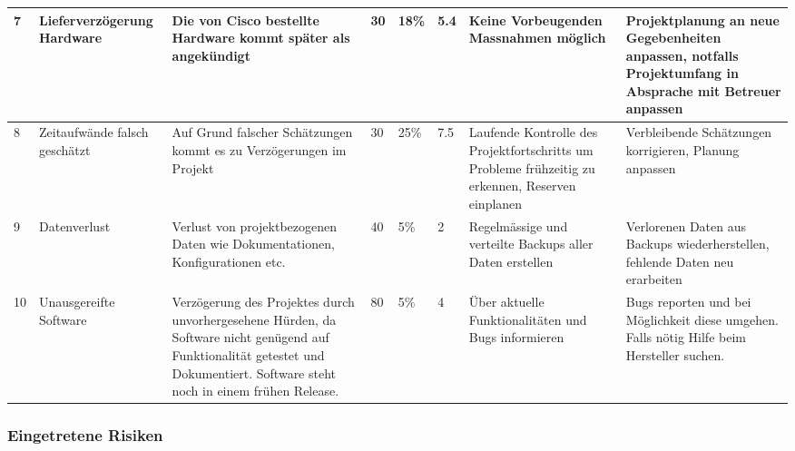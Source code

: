 \begin{landscape}
\begin{longtable}{|m{0.5cm}|m{3cm}|m{5cm}|m{0.75cm}|m{0.75cm}|m{0.75cm}|m{5cm}|m{5cm}|}
	\hline
	7 & Lieferverzögerung Hardware & Die von Cisco bestellte Hardware kommt später als angekündigt & 30 & 18\% & 5.4 & Keine Vorbeugenden Massnahmen möglich & Projektplanung an neue Gegebenheiten anpassen, notfalls Projektumfang in Absprache mit Betreuer anpassen \\
	\hline
	8 & Zeitaufwände falsch geschätzt & Auf Grund falscher Schätzungen kommt es zu Verzögerungen im Projekt & 30 & 25\% & 7.5 & Laufende Kontrolle des Projektfortschritts um Probleme frühzeitig zu erkennen, Reserven einplanen & Verbleibende Schätzungen korrigieren, Planung anpassen \\
	\hline
	9 & Datenverlust & Verlust von projektbezogenen Daten wie Dokumentationen, Konfigurationen etc. & 40 & 5\% & 2 & Regelmässige und verteilte Backups aller Daten erstellen & Verlorenen Daten aus Backups wiederherstellen, fehlende Daten neu erarbeiten \\
	\hline
	10 & Unausgereifte Software & Verzögerung des Projektes durch unvorhergesehene Hürden, da Software nicht genügend auf Funktionalität getestet und Dokumentiert. Software steht noch in einem frühen Release. & 80 & 5\% & 4 & Über aktuelle Funktionalitäten und Bugs informieren & Bugs reporten und bei Möglichkeit diese umgehen. Falls nötig Hilfe beim Hersteller suchen. \\
	\hline
\end{longtable}

\end{landscape}



\subsubsection{Eingetretene Risiken}
